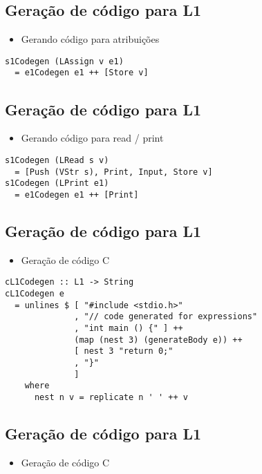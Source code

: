\documentclass[11pt]{article}
\begin{document}
\subsection*{Geração de código para L1}
\label{sec:org3dd3b9f}

\begin{itemize}
\item Gerando código para atribuições
\end{itemize}

\begin{verbatim}
s1Codegen (LAssign v e1)
  = e1Codegen e1 ++ [Store v]
\end{verbatim}
\subsection*{Geração de código para L1}
\label{sec:orgddfa80f}

\begin{itemize}
\item Gerando código para read / print
\end{itemize}

\begin{verbatim}
s1Codegen (LRead s v)
  = [Push (VStr s), Print, Input, Store v]
s1Codegen (LPrint e1)
  = e1Codegen e1 ++ [Print]
\end{verbatim}
\subsection*{Geração de código para L1}
\label{sec:org9cfa781}

\begin{itemize}
\item Geração de código C
\end{itemize}

\begin{verbatim}
cL1Codegen :: L1 -> String
cL1Codegen e
  = unlines $ [ "#include <stdio.h>"
              , "// code generated for expressions"
              , "int main () {" ] ++
              (map (nest 3) (generateBody e)) ++
              [ nest 3 "return 0;"
              , "}"
              ]
    where
      nest n v = replicate n ' ' ++ v
\end{verbatim}
\subsection*{Geração de código para L1}
\label{sec:org1b3513d}

\begin{itemize}
\item Geração de código C
\end{itemize}
\end{document}
